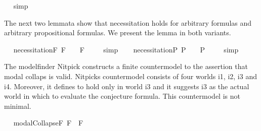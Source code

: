 \begin{isabellebody}
\isadelimproof
\ %
\endisadelimproof
%
\isatagproof
{}\isamarkupfalse%
\ simp\ \isamarkupfalse%
%
\endisatagproof
{\isafoldproof}%
%
\isadelimproof
%
\endisadelimproof
%
\isamarkuptrue%
%
\begin{isamarkuptext}%
The next two lemmata show that necessitation holds for arbitrary formulas 
  and arbitrary propositional formulas. We present the lemma in both variants.%
\end{isamarkuptext}%
\isamarkuptrue%
\ \isamarkupfalse%
\ necessitationF{\isacharcolon}\ {\isachardoublequoteopen}{\isacharbrackleft}{\isasymphi}\isactrlsup F{\isacharbrackright}\ {\isacharequal}\ {\isasymtop}\ {\isasymlongrightarrow}\ {\isacharbrackleft}\isactrlbold {\isasymbox}{\isasymphi}\isactrlsup F{\isacharbrackright}\ {\isacharequal}\ {\isasymtop}{\isachardoublequoteclose}%
\isadelimproof
\ %
\endisadelimproof
%
\isatagproof
{}\isamarkupfalse%
\ simp\ \isamarkupfalse%
%
\endisatagproof
{\isafoldproof}%
%
\isadelimproof
%
\endisadelimproof
\isanewline
\ \isamarkupfalse%
\ necessitationP{\isacharcolon}\ {\isachardoublequoteopen}{\isacharbrackleft}{\isasymphi}\isactrlsup P{\isacharbrackright}\ {\isacharequal}\ {\isasymtop}\ {\isasymlongrightarrow}\ {\isacharbrackleft}\isactrlbold {\isasymbox}{\isasymphi}\isactrlsup P{\isacharbrackright}\ {\isacharequal}\ {\isasymtop}{\isachardoublequoteclose}%
\isadelimproof
\ %
\endisadelimproof
%
\isatagproof
{}\isamarkupfalse%
\ simp\ \isamarkupfalse%
%
\endisatagproof
{\isafoldproof}%
%
\isadelimproof
%
\endisadelimproof
%
\isamarkuptrue%
%
\begin{isamarkuptext}%
The modelfinder Nitpick constructs a finite countermodel to the assertion
  that modal collaps is valid. Nitpicks countermodel consists of four worlds i1, i2, i3 and i4.
  Moreover, it defines  \isa{{\isasymphi}} to hold only in world i3 and it suggests i3 as the actual 
  world in which to evaluate the conjecture formula. This countermodel is not minimal.%
\end{isamarkuptext}%
\isamarkuptrue%
\ \isamarkupfalse%
\ modalCollapseF{\isacharcolon}\ {\isachardoublequoteopen}{\isacharbrackleft}{\isasymphi}\isactrlsup F\ \isactrlbold {\isasymrightarrow}\ \isactrlbold {\isasymbox}{\isasymphi}\isactrlsup F{\isacharbrackright}\ {\isacharequal}\ {\isasymtop}{\isachardoublequoteclose}%
\isadelimproof

\end{isabellebody}
